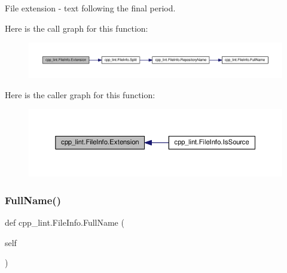 \begin{DoxyVerb}File extension - text following the final period.\end{DoxyVerb}
 Here is the call graph for this function\+:
\nopagebreak
\begin{figure}[H]
\begin{center}
\leavevmode
\includegraphics[width=350pt]{classcpp__lint_1_1_file_info_ac968b5d06e9638f7412977aa772261d1_cgraph}
\end{center}
\end{figure}
Here is the caller graph for this function\+:
\nopagebreak
\begin{figure}[H]
\begin{center}
\leavevmode
\includegraphics[width=350pt]{classcpp__lint_1_1_file_info_ac968b5d06e9638f7412977aa772261d1_icgraph}
\end{center}
\end{figure}
\mbox{\label{classcpp__lint_1_1_file_info_a36b6595254838baeb10a7b4df6c97e46}} 
\subsubsection{\texorpdfstring{Full\+Name()}{FullName()}}
{\footnotesize\ttfamily def cpp\+\_\+lint.\+File\+Info.\+Full\+Name (\begin{DoxyParamCaption}\item[{}]{self }\end{DoxyParamCaption})}


